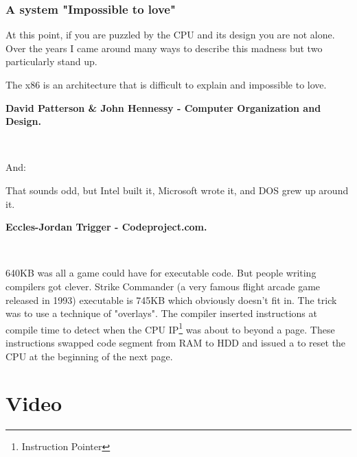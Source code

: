 \documentclass[book.tex]{subfiles}
\begin{document}
\subsubsection{A system "Impossible to love"}
At this point, if you are puzzled by the CPU and its design you are not alone. Over the years I came around many ways to describe this madness but two particularly stand up.\\
\par
 \begin{fancyquotes}
   The x86 is an architecture that is difficult to explain and impossible to love.\\
   \par
\textbf{David Patterson \& John Hennessy - Computer Organization and Design.}
 \end{fancyquotes}\\
\par
And:\\
\par
 \begin{fancyquotes}
    That sounds odd, but Intel built it, Microsoft wrote it, and DOS grew up around it.\\
   \par
\textbf{Eccles-Jordan Trigger - Codeproject.com.}
 \end{fancyquotes}\\



\par
{} 640KB was all a game could have for executable code. But people writing compilers got clever. Strike Commander (a very famous flight arcade game released in 1993) executable is 745KB which obviously doesn't fit in. The trick was to use a technique of "overlays". The compiler inserted instructions at compile time to detect when the CPU IP\footnote{Instruction Pointer} was about to beyond a page. These instructions swapped code segment from RAM to HDD and issued a  to reset the CPU at the beginning of the next page.

















\section{Video}
\end{document}
